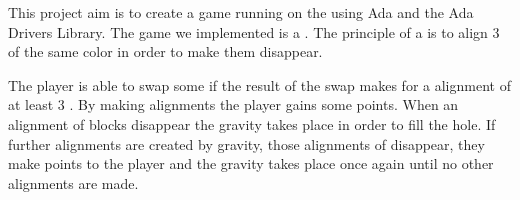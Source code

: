 This project aim is to create a game running on the \stmdb using Ada and the Ada Drivers Library. The game we implemented is a \mtg.
The principle of a \mtg is to align 3 \sqs of the same color in order to make them disappear.

The player is able to swap some \sqs if the result of the swap makes for a alignment of at least 3 \sqs.
By making alignments the player gains some points. When an alignment of blocks disappear the gravity takes place in order to fill the hole.
If further alignments are created by gravity, those alignments of \sqs disappear, they make points to the player and the gravity takes place once again until no other alignments are made.
